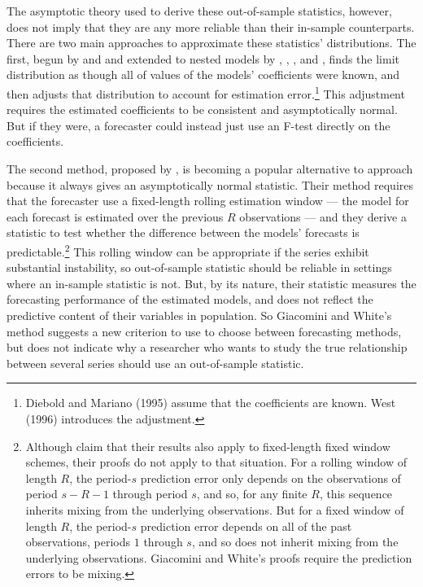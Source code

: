 \documentclass[11pt]{article} \def\baselinestretch{1.08}
\begin{document}
The asymptotic theory used to derive these out-of-sample
statistics, however, does not imply that they are any more reliable
than their in-sample counterparts.  There are two main approaches to
approximate these statistics' distributions.  The first, begun by
 and
 and extended to nested models by
, ,
, and
, finds the limit distribution
as though all of values of the models' coefficients were known, and
then adjusts that distribution to account for estimation
error.\footnote{Diebold and Mariano (1995) assume that the
  coefficients are known.  West (1996) 
  introduces the adjustment.} This adjustment requires the estimated
coefficients to be consistent and asymptotically normal.  But if they
were, a forecaster could instead just use an F-test directly on the
coefficients.

The second method, proposed by , is
becoming a popular alternative to
approach because it always
gives an asymptotically normal statistic.  Their method
requires that the forecaster use a fixed-length rolling estimation
window --- the model for each forecast is estimated over the
previous $R$ observations --- and they derive a statistic to test
whether the difference between the models' forecasts is 
predictable.\footnote{Although  claim that
  their results also apply to fixed-length fixed window schemes, their
  proofs do not apply to that situation.  For a rolling window of
  length $R$, the period-$s$ prediction error only depends on the
  observations of period $s-R-1$ through period $s$, and so, for any 
  finite $R$, this sequence inherits mixing from the underlying
  observations.  But for a fixed window of length $R$, the
  period-$s$ prediction error depends on all of the past
  observations, periods $1$ through $s$, and so does not inherit
  mixing  from the underlying observations. Giacomini and White's
  proofs  require the prediction errors to be mixing.}
This rolling window can be appropriate if the series exhibit
substantial instability, so 
out-of-sample 
statistic should be reliable in settings where an in-sample statistic
is not.  But, by its nature, their statistic measures the forecasting
performance of the estimated models, and does not reflect the
predictive content of their variables in population.  So Giacomini and
White's method suggests a new criterion to use to choose between
forecasting methods, but does not indicate why a researcher who wants
to study the true relationship between several series should use an
out-of-sample statistic.
\end{document}
